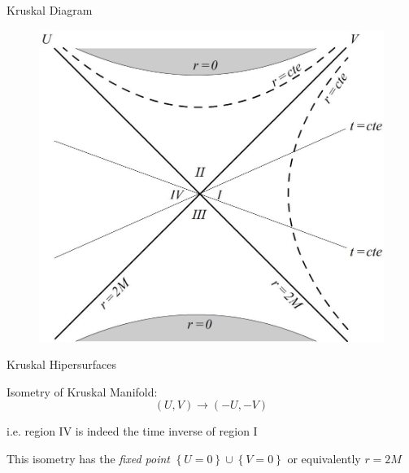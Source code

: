 \documentclass{beamer}
\begin{document}
        \begin{frame}{Kruskal Diagram}
        	\begin{center}
				\begin{figure}
				\includegraphics[scale=0.24] {fig5.jpg}
				\end{figure}
			\end{center}	
        \end{frame}
        
        \begin{frame}{Kruskal Hipersurfaces}
			
            Isometry of Kruskal Manifold:
            $$\left(U,V\right)\longrightarrow\left(-U,-V\right)$$
            
			i.e. region IV is indeed the time inverse of region I
            \pause
            \bigskip
            
            This isometry has the \emph{fixed point}  $\left\{ U=0\right\} \cup\left\{V=0\right\} $ or equivalently $r=2M$
        \end{frame}
        
\end{document}
